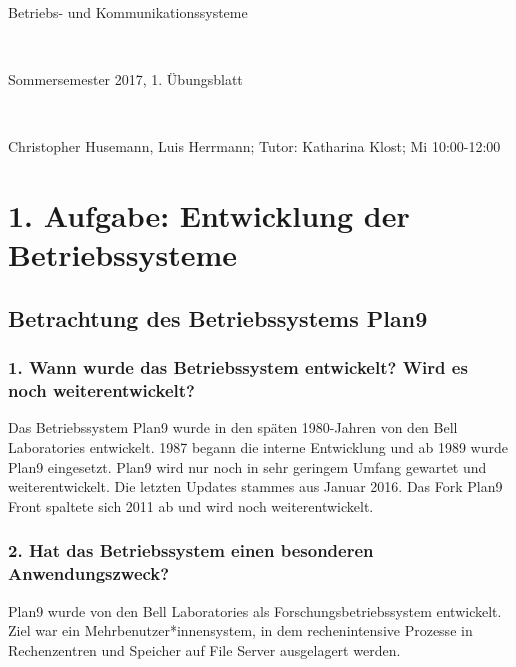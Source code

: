 \documentclass[numbers=noendperiod]{scrartcl}
\begin{document}
	
\newcommand{\inputmintedframed}[2]{
	\begin{mdframed}[linecolor=bg,backgroundcolor=bg]
		\inputminted[mathescape,breaklines,linenos,numbersep=5pt,tabsize=3]{#1}{#2}
	\end{mdframed}}
	
\hrulefill
\begin{center}
	\bfseries %
	\sffamily %
	\begin{huge}
		Betriebs- und Kommunikationssysteme
	\end{huge}\\
	\begin{Large}
		Sommersemester 2017, 1. Übungsblatt
	\end{Large}\\
	\begin{small}
		Christopher Husemann, Luis Herrmann; Tutor: Katharina Klost; Mi 10:00-12:00
	\end{small}
	
	\vspace{-10pt}
\end{center}
\hrulefill

\section*{1. Aufgabe: Entwicklung der Betriebssysteme}
\subsection*{Betrachtung des Betriebssystems Plan9}

\subsubsection*{1. Wann wurde das Betriebssystem entwickelt? Wird es noch weiterentwickelt?}
Das Betriebssystem Plan9 wurde in den späten 1980-Jahren von den Bell Laboratories entwickelt. 1987 begann die interne Entwicklung und ab 1989 wurde Plan9 eingesetzt. Plan9 wird nur noch in sehr geringem Umfang gewartet und weiterentwickelt. Die letzten Updates stammes aus Januar 2016. Das Fork Plan9 Front spaltete sich 2011 ab und wird noch weiterentwickelt.

\subsubsection*{2. Hat das Betriebssystem einen besonderen Anwendungszweck?}
Plan9 wurde von den Bell Laboratories als Forschungsbetriebssystem entwickelt. Ziel war ein Mehrbenutzer*innensystem, in dem rechenintensive Prozesse in Rechenzentren und Speicher auf File Server ausgelagert werden. 
\end{document}
